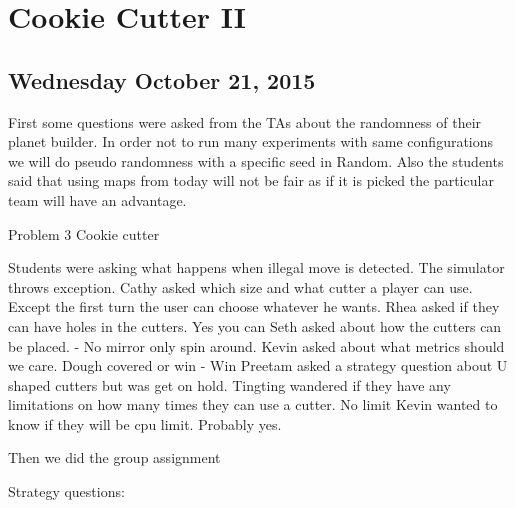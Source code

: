 \section{Cookie Cutter II}
\subsection{Wednesday October 21, 2015}
First some questions were asked from the TAs about the randomness of their planet builder.
In order not to run many experiments with same configurations we will do pseudo randomness with a specific seed in Random. 
Also the students said that using maps from today will not be fair as if it is picked the particular team will have an advantage.

Problem 3 Cookie cutter

Students were asking what happens when illegal move is detected.
The simulator throws exception.
Cathy asked which size and what cutter a player can use.
Except the first turn the user can choose whatever he wants.
Rhea asked if they can have holes in the cutters. Yes you can
Seth asked about how the cutters can be placed. - No mirror only spin around.
Kevin asked about what metrics should we care. Dough covered or win - Win
Preetam asked a strategy question about U shaped cutters but was get on hold.
Tingting wandered if they have any limitations on how many times they can use a cutter. No limit
Kevin wanted to know if they will be cpu limit. Probably yes.

Then we did the group assignment 

Strategy questions:

